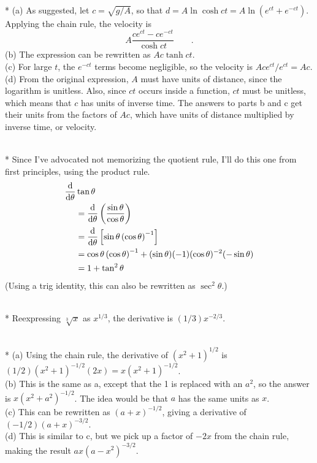 \\*
(a) As suggested, let $c=\sqrt{g/A}$, so that  $d = A \ln\cosh ct=A\ln\left(e^{ct}+e^{-ct}\right)$.
Applying the chain rule, the velocity is
\begin{equation*}
  A\frac{ce^{ct}-ce^{-ct}}{\cosh ct} \qquad .
\end{equation*}
(b) The expression can be rewritten as $Ac\tanh ct$.\\
(c) For large $t$, the $e^{-ct}$ terms become negligible, so the velocity is $Ace^{ct}/e^{ct}=Ac$.
(d) From the original expression, $A$ must have units of distance, since the logarithm is unitless.
Also, since $ct$ occurs inside a function, $ct$ must be unitless, which means that $c$ has units
of inverse time. The answers to parts b and c get their units from the factors of $Ac$, which have
units of distance multiplied by inverse time, or velocity.

\\*
Since I've advocated not memorizing the quotient rule, I'll do this one from first principles,
using the product rule.
\begin{align*}
  \frac{\textup{d}}{\textup{d} \theta}& \tan\theta \\
        &=   \frac{\textup{d}}{\textup{d} \theta}\left(\frac{\sin\theta}{\cos\theta}\right) \\
        &=   \frac{\textup{d}}{\textup{d} \theta}\left[\sin\theta\left(\cos\theta\right)^{-1}\right] \\
        &=   \cos\theta\left(\cos\theta\right)^{-1}+(\sin\theta)(-1)(\cos\theta)^{-2}(-\sin\theta)\\
        &=   1+\tan^2\theta
\end{align*}
(Using a trig identity, this can also be rewritten as $\sec^2\theta$.)

\\*
Reexpressing $\sqrt[3]{x}$ as $x^{1/3}$, the derivative is $(1/3)x^{-2/3}$.

\\*
(a) Using the chain rule, the derivative of $(x^2+1)^{1/2}$ is $(1/2)(x^2+1)^{-1/2}(2x)=x(x^2+1)^{-1/2}$.\\
(b) This is the same as a, except that the 1 is replaced with an $a^2$, so the answer is $x(x^2+a^2)^{-1/2}$. The idea
would be that $a$ has the same units as $x$.\\
(c) This can be rewritten as $(a+x)^{-1/2}$, giving a derivative of $(-1/2)(a+x)^{-3/2}$.\\
(d) This is similar to c, but we pick up a factor of $-2x$ from the chain rule, making the result
$ax(a-x^2)^{-3/2}$.

